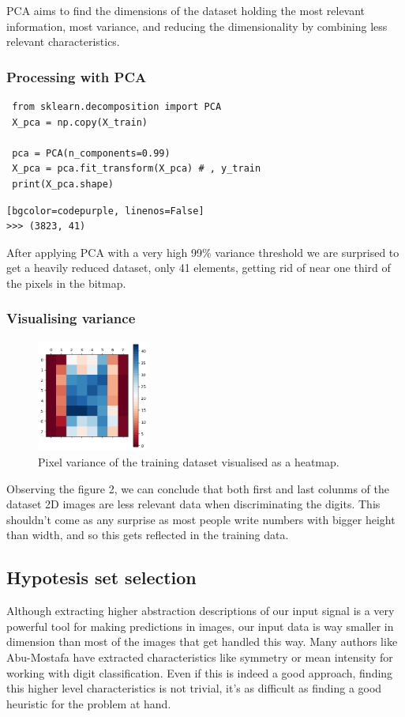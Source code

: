 \documentclass{article}
\begin{document}
PCA aims to find the dimensions of the dataset holding the most relevant information, most variance, and reducing the dimensionality by combining less relevant characteristics.


\subsubsection{Processing with PCA}
\begin{verbatim}
 from sklearn.decomposition import PCA
 X_pca = np.copy(X_train)

 pca = PCA(n_components=0.99)
 X_pca = pca.fit_transform(X_pca) # , y_train
 print(X_pca.shape)
\end{verbatim}

\begin{verbatim}[bgcolor=codepurple, linenos=False]
>>> (3823, 41)
\end{verbatim}

After applying PCA with a very high 99\% variance threshold we are surprised to get a heavily reduced dataset, only 41 elements, getting rid of near one third of the pixels in the bitmap.

\subsubsection{Visualising variance}
\begin{figure}[H]
    \centering
    \includegraphics[width=140px]{figures/fig02.png}
    \caption{Pixel variance of the training dataset visualised as a heatmap.}
    \label{fig:variance-heatmap}
\end{figure}

Observing the figure 2, we can conclude that both first and last colunms of the dataset 2D images are less relevant data when discriminating the digits. This shouldn't come as any surprise as most people write numbers with bigger height than width, and so this gets reflected in the training data.

\subsection{Hypotesis set selection}
Although extracting higher abstraction descriptions of our input signal is a very powerful tool for making predictions in images, our input data is way smaller in dimension than most of the images that get handled this way. Many authors like Abu-Mostafa \cite{Abu-Mostafa:2012:LD:2207825} have extracted characteristics like symmetry or mean intensity for working with digit classification. Even if this is indeed a good approach, finding this higher level characteristics is not trivial, it's as difficult as finding a good heuristic for the problem at hand.
\end{document}
